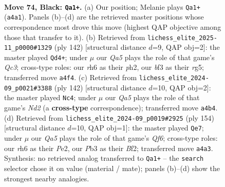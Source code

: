 \documentclass[11pt]{article}
\begin{document}
\clearpage

\begin{figure}[p]\centering
\begin{subfigure}{0.46\textwidth}\centering
\resizebox{\linewidth}{!}{%
\newchessgame
\chessboard[
  setfen={8/8/7R/4b3/q7/1p1k1B2/8/5K2 b - - 5 74},
  showmover=false,
  pgfstyle=straightmove, color=movearrow, markmove={a4-a1}
]}
\caption{}
\end{subfigure}\hfill
\begin{subfigure}{0.46\textwidth}\centering
\resizebox{\linewidth}{!}{%
\newchessgame
\chessboard[
  setfen={8/3k4/8/6r1/8/2Q1P3/5K1p/8 w - - 4 72},
  showmover=false,
  pgfstyle=straightmove, color=movearrow, markmove={c3-d4}
]}
\caption{}
\end{subfigure}
\\[4pt]
\begin{subfigure}{0.46\textwidth}\centering
\resizebox{\linewidth}{!}{%
\newchessgame
\chessboard[
  setfen={5k2/1b6/8/4KP2/8/7r/3N4/8 w - - 0 72},
  showmover=false,
  pgfstyle=straightmove, color=movearrow, markmove={d2-c4}
]}
\caption{}
\end{subfigure}\hfill
\begin{subfigure}{0.46\textwidth}\centering
\resizebox{\linewidth}{!}{%
\newchessgame
\chessboard[
  setfen={1N4k1/8/5Q2/8/8/1K6/4PB2/1B6 w - - 13 78},
  showmover=false,
  pgfstyle=straightmove, color=movearrow, markmove={f6-e7}
]}
\caption{}
\end{subfigure}
\caption{\textbf{Move 74, Black: \texttt{Qa1+}.} (a) Our position; Melanie plays \texttt{Qa1+} (\texttt{a4a1}). Panels (b)--(d) are the retrieved master positions whose correspondence most drove this move (highest QAP objective among those that transfer to it). (b) Retrieved from \texttt{lichess\_elite\_2025-11\_p0000\#1329} (ply 142) [structural distance $d$=9, QAP obj=2]: the master played \texttt{Qd4+}; under $\mu$ our \emph{Qa5} plays the role of that game's \emph{Qc3}; cross-type roles: our \emph{r}h6 as their \emph{p}h2, our \emph{b}f3 as their \emph{r}g5; transferred move \texttt{a4f4}. (c) Retrieved from \texttt{lichess\_elite\_2024-09\_p0021\#3388} (ply 142) [structural distance $d$=10, QAP obj=2]: the master played \texttt{Nc4}; under $\mu$ our \emph{Qa5} plays the role of that game's \emph{Nd2} (a \textbf{cross-type} correspondence); transferred move \texttt{a4b4}. (d) Retrieved from \texttt{lichess\_elite\_2024-09\_p0019\#2925} (ply 154) [structural distance $d$=10, QAP obj=1]: the master played \texttt{Qe7}; under $\mu$ our \emph{Qa5} plays the role of that game's \emph{Qf6}; cross-type roles: our \emph{r}h6 as their \emph{P}e2, our \emph{P}b3 as their \emph{B}f2; transferred move \texttt{a4a3}. Synthesis: no retrieved analog transferred to \texttt{Qa1+} -- the \texttt{search} selector chose it on value (material / mate); panels (b)--(d) show the strongest nearby analogies.}
\label{fig:thought-m147}
\end{figure}
\end{document}

